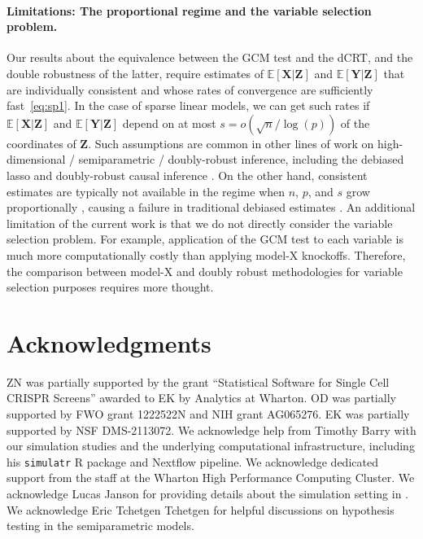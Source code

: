 \documentclass[12pt]{article}
\theoremstyle{definition}
\theoremstyle{remark}
\newcommand{\E}{\mathbb E}								%
\newcommand{\prx}{\bm X}								%
\newcommand{\prz}{\bm Z}								%
\newcommand{\pry}{{\bm Y}}								%
\begin{document}
\paragraph{Limitations: The proportional regime and the variable selection problem.} 

Our results about the equivalence between the GCM test and the dCRT, and the double robustness of the latter, require estimates of $\E[\prx|\prz]$ and $\E[\pry|\prz]$ that are individually consistent and whose rates of convergence are sufficiently fast~\eqref{eq:sp1}. In the case of sparse linear models, we can get such rates if $\E[\prx|\prz]$ and $\E[\pry|\prz]$ depend on at most $s = o(\sqrt{n}/\log(p))$ of the coordinates of $\prz$. Such assumptions are common in other lines of work on high-dimensional / semiparametric / doubly-robust inference, including the debiased lasso \citep{VanDeGeer2014, ZZ14, Javanmard2014, Ning2017, Jankova2018a} and doubly-robust causal inference \citep{BetH14, Chernozhukov2018}. On the other hand, consistent estimates are typically not available in the regime when $n$, $p$, and $s$ grow proportionally \citep{Bayati2011}, causing a failure in traditional debiased estimates \citep{Celentano2021}. An additional limitation of the current work is that we do not directly consider the variable selection problem. For example, application of the GCM test to each variable is much more computationally costly than applying model-X knockoffs. Therefore, the comparison between model-X and doubly robust methodologies for variable selection purposes requires more thought.

\section*{Acknowledgments}

ZN was partially supported by the grant ``Statistical Software for Single Cell CRISPR Screens'' awarded to EK by Analytics at Wharton. OD was partially supported by FWO grant 1222522N and NIH grant AG065276. EK was partially supported by NSF DMS-2113072.  We acknowledge help from Timothy Barry with our simulation studies and the underlying computational infrastructure, including his \verb|simulatr| R package and Nextflow pipeline. We acknowledge dedicated support from the staff at the Wharton High Performance Computing Cluster. We acknowledge Lucas Janson for providing details about the simulation setting in \citet{CetL16}. We acknowledge Eric Tchetgen Tchetgen for helpful discussions on hypothesis testing in the semiparametric models.
\end{document}
